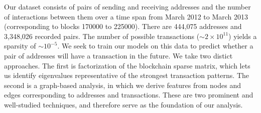 \documentclass{article} %
\begin{document}
Our dataset consists of pairs of sending and receiving addresses and the number of interactions between them over a time span from March 2012 to March 2013 (corresponding to blocks 170000 to 225000). There are 444,075 addresses and 3,348,026 recorded pairs. The number of possible transactions ($\sim 2 \times 10^{11}$) yields a sparsity of $\sim 10^{-5}$. We seek to train our models on this data to predict whether a pair of addresses will have a transaction in the future. We take two distict approaches. The first is factorization of the blockchain sparse matrix, which lets us identify eigenvalues representative of the strongest transaction patterns. The second is a graph-based analysis, in which we derive features from nodes and edges corresponding to addresses and transactions. These are two prominent and well-studied techniques, and therefore serve as the foundation of our analysis.
\end{document}
